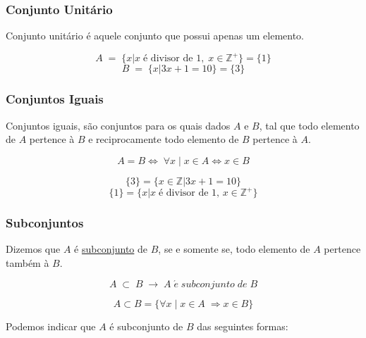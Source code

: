 \subsubsection{Conjunto Unitário}
\begin{definition}
	Conjunto unitário é aquele conjunto que possui apenas um elemento.
\end{definition}

\begin{example}
	
	$$ A \; = \; \{ x | x \; \text{é divisor de } 1, \; x \in \mathbb{Z^+} \} = \{ 1 \} $$ 
	$$ B \; = \; \{ x| 3x+1 = 10 \}  = \{ 3 \}$$
	
\end{example}

\subsubsection{Conjuntos Iguais}
\begin{definition}
	Conjuntos iguais, são conjuntos para os quais dados $A$ e $B$, tal que todo elemento de $A$ pertence à $B$ e reciprocamente todo elemento de $B$ pertence à $A$.
	
	$$ A = B  \Leftrightarrow \; \forall x \; | \; x \in A \Leftrightarrow x \in B$$
\end{definition}

\begin{example}
	$$\{ 3 \} = \{ x \in \mathbb{Z} | 3x+1 = 10 \} $$
	$$\{ 1 \} = \{ x | x \; \text{é divisor de 1, } x \in \mathbb{Z^+} \} $$
\end{example}

\subsubsection{Subconjuntos}
\begin{definition}
	Dizemos que $A$ é \underline{subconjunto} de $B$, se e somente se, todo elemento de $A$ pertence também à $B$.
	
	$$ A \; \subset \; B \; \rightarrow  \;A \; \acute{e} \; subconjunto \; de \; B $$
	
	$$ A \subset B = \{ \forall x \; | \; x \in A \; \Rightarrow x \in B  \} $$
\end{definition}

Podemos indicar que $A$ é subconjunto de $B$ das seguintes formas:\\

